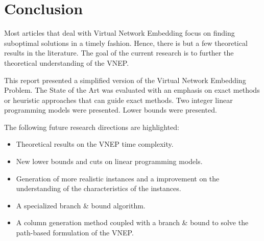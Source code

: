 \section{Conclusion}
\label{sec:conclusion}
Most articles that deal with Virtual Network Embedding focus on finding suboptimal solutions in a timely fashion. Hence, there is but a few theoretical results in the literature. The goal of the current research is to further the theoretical understanding of the VNEP.

This report presented a simplified version of the Virtual Network Embedding Problem. The State of the Art was evaluated with an emphasis on exact methods or heuristic approaches that can guide exact methods. Two integer linear programming models were presented. Lower bounds were presented.

The following future research directions are highlighted:

\begin{itemize}
  \item Theoretical results on the VNEP time complexity.
  \item New lower bounds and cuts on linear programming models.
  \item Generation of more realistic instances and a improvement on the understanding of the characteristics of the instances.
  \item A specialized branch \& bound algorithm.
  \item A column generation method coupled with a branch \& bound to solve the path-based formulation of the VNEP.
\end{itemize}
